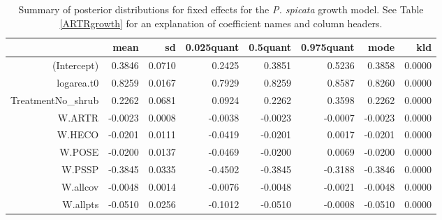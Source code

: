 \documentclass[11pt]{article}
\begin{document}
\begin{table}[ht]
\centering
\caption{Summary of posterior distributions for fixed effects for the \textit{P. spicata} growth model. See Table \ref{ARTRgrowth} for an explanation of coefficient names
and column headers.} 
\label{PSSPgrowth}
\begin{tabular}{rrrrrrrr}
  \hline
 & mean & sd & 0.025quant & 0.5quant & 0.975quant & mode & kld \\ 
  \hline
(Intercept) & 0.3846 & 0.0710 & 0.2425 & 0.3851 & 0.5236 & 0.3858 & 0.0000 \\ 
  logarea.t0 & 0.8259 & 0.0167 & 0.7929 & 0.8259 & 0.8587 & 0.8260 & 0.0000 \\ 
  TreatmentNo\_shrub & 0.2262 & 0.0681 & 0.0924 & 0.2262 & 0.3598 & 0.2262 & 0.0000 \\ 
  W.ARTR & -0.0023 & 0.0008 & -0.0038 & -0.0023 & -0.0007 & -0.0023 & 0.0000 \\ 
  W.HECO & -0.0201 & 0.0111 & -0.0419 & -0.0201 & 0.0017 & -0.0201 & 0.0000 \\ 
  W.POSE & -0.0200 & 0.0137 & -0.0469 & -0.0200 & 0.0069 & -0.0200 & 0.0000 \\ 
  W.PSSP & -0.3845 & 0.0335 & -0.4502 & -0.3845 & -0.3188 & -0.3846 & 0.0000 \\ 
  W.allcov & -0.0048 & 0.0014 & -0.0076 & -0.0048 & -0.0021 & -0.0048 & 0.0000 \\ 
  W.allpts & -0.0510 & 0.0256 & -0.1012 & -0.0510 & -0.0008 & -0.0510 & 0.0000 \\ 
   \hline
\end{tabular}
\end{table}
\end{document}
